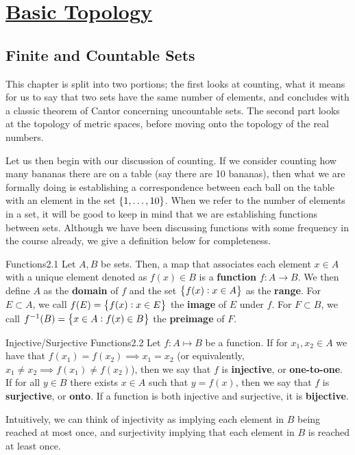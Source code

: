 \newpage
\section[Basic Topology]{\hyperlink{toc}{Basic Topology}}
\subsection{Finite and Countable Sets}
This chapter is split into two portions; the first looks at counting, what it means for us to say that two sets have the same number of elements, and concludes with a classic theorem of Cantor concerning uncountable sets. The second part looks at the topology of metric spaces, before moving onto the topology of the real numbers. 

Let us then begin with our discussion of counting. If we consider counting how many bananas there are on a table (say there are 10 bananas), then what we are formally doing is establishing a correspondence between each ball on the table with an element in the set $\set{1, \ldots, 10}$. When we refer to the number of elements in a set, it will be good to keep in mind that we are establishing functions between sets. Although we have been discussing functions with some frequency in the course already, we give a definition below for completeness. 

\begin{definition}{Functions}{2.1}
    Let $A, B$ be sets. Then, a map that associates each element $x \in A$ with a unique element denoted as $f(x) \in B$ is a \textbf{function} $f: A \rightarrow B$. We then define $A$ as the \textbf{domain} of $f$ and the set $\set{f(x): x \in A}$ as the \textbf{range}. For $E \subset A$, we call $f(E) = \set{f(x): x \in E}$ the \textbf{image} of $E$ under $f$. For $F \subset B$, we call $f^{-1}(B) = \set{x \in A: f(x) \in B}$ the \textbf{preimage} of $F$. 
\end{definition}

\begin{definition}{Injective/Surjective Functions}{2.2}
    Let $f: A \mapsto B$ be a function. If for $x_1, x_2 \in A$ we have that $f(x_1) = f(x_2) \implies x_1 = x_2$ (or equivalently, $x_1 \neq x_2 \implies f(x_1) \neq f(x_2)$), then we say that $f$ is \textbf{injective}, or \textbf{one-to-one}. If for all $y \in B$ there exists $x \in A$ such that $y = f(x)$, then we say that $f$ is \textbf{surjective}, or \textbf{onto}. If a function is both injective and surjective, it is \textbf{bijective}.
\end{definition}
\noindent Intuitively, we can think of injectivity as implying each element in $B$ being reached at most once, and surjectivity implying that each element in $B$ is reached at least once. 

